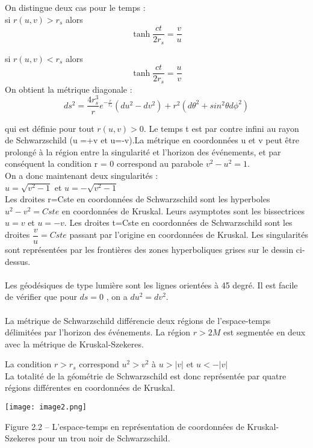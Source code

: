 \documentclass[12pt,  a4paper, openright]{report} %
\begin{document}
On distingue deux cas pour le temps :\\
si $r(u,v)>r_{s}$ alors 
\begin{equation}
\tanh\dfrac{ct}{2r_{s}}=\dfrac{v}{u}
\end{equation}

si $r(u,v)<r_{s}$ alors 
\begin{equation}
\tanh\dfrac{ct}{2r_{s}}=\dfrac{u}{v}
\end{equation}
On obtient la métrique diagonale :
\begin{equation}
ds^{2}=\dfrac{4r_{s}^{3}}{r}e^{-\frac{r}{r_{s}}}(du^{2}-dv^{2})+r^{2}(d\theta^{2}+sin^{2}\theta d\phi^{2})
\end{equation}

qui est définie pour tout  $r(u,v)>0$. Le temps t est par contre infini au rayon de Schwarzschild (u =+v  et  u=-v).La métrique en coordonnées u et v peut être prolongé à la région entre
la singularité et l’horizon des événements, et par conséquent la condition r = 0 correspond au
parabole $ v^{2}-u^{2} = 1$.\\
On a donc maintenant deux singularités : \\
$u=\sqrt{v^{2}-1}$ et $u=-\sqrt{v^{2}-1}$\\
Les droites  r=Cste en coordonnées de Schwarzschild sont les hyperboles\\ $ u^{2}-v^{2}=Cste$ en coordonnées de Kruskal. Leurs asymptotes sont les bissectrices $ u=v$ et $ u=-v$. Les droites  t=Cste en coordonnées de Schwarzschild sont les droites $ \dfrac{v}{u}=Cste$ passant par l'origine en coordonnées de Kruskal. Les singularités sont représentées par les frontières des zones hyperboliques grises sur le dessin ci-dessus.\\
\\
Les géodésiques de type lumière sont les lignes orientées à 45 degré. Il est facile de vérifier que pour  $ds=0$ , on a $ du^{2}=dv^{2}$.\\
\\
La métrique de Schwarzschild différencie deux régions de l'espace-temps délimitées par l'horizon des événements. La région $ r>2M$ est segmentée en deux avec la métrique de Kruskal-Szekeres.

La condition $ r>r_{s}$ correspond $ u^{2}>v^{2}$ à $ u>|v|$ et $u<-|v|$\\
La totalité de la géométrie de Schwarzschild est donc représentée par quatre régions différentes en coordonnées de Kruskal.
\begin{center}
	\texttt{[image: image2.png]}
	
\end{center}
Figure 2.2 – L’espace-temps en représentation de coordonnées de Kruskal-Szekeres
pour un trou noir de Schwarzschild.
\end{document}
